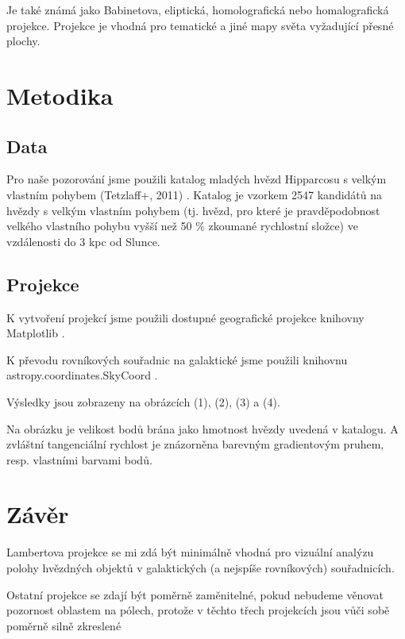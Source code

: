 \documentclass[a4paper,11pt]{article}
\begin{document}
    \hspace{10pt}
    \begin{minipage}[t]{0.5\textwidth} 
                Je také známá jako Babinetova, eliptická, homolografická nebo homalografická projekce. Projekce je vhodná pro tematické a jiné mapy světa vyžadující přesné plochy.
        \section{Metodika}
            \subsection{Data}
                Pro naše pozorování jsme použili katalog mladých hvězd Hipparcosu s velkým vlastním pohybem (Tetzlaff+, 2011) \cite{catalog}. Katalog je vzorkem 2547 kandidátů na hvězdy s velkým vlastním pohybem (tj. hvězd, pro které je pravděpodobnost velkého vlastního pohybu vyšší než 50 \%  zkoumané rychlostní složce) ve vzdálenosti do 3 kpc od Slunce.
            \subsection{Projekce}
                K vytvoření projekcí jsme použili dostupné geografické projekce knihovny Matplotlib \cite{proj}.
                \par K převodu rovníkových souřadnic na galaktické jsme použili knihovnu astropy.coordinates.SkyCoord \cite{astropy}. 
                \par Výsledky jsou zobrazeny na obrázcích (1), (2), (3) a (4).
                \par Na obrázku je velikost bodů brána jako hmotnost hvězdy uvedená v katalogu. A zvláštní tangenciální rychlost je znázorněna barevným gradientovým pruhem, resp. vlastními barvami bodů. 
            \section{Závěr}
                Lambertova projekce se mi zdá být minimálně vhodná pro vizuální analýzu polohy hvězdných objektů v galaktických (a nejspíše rovníkových) souřadnicích.
                \par Ostatní projekce se zdají být poměrně zaměnitelné, pokud nebudeme věnovat pozornost oblastem na pólech, protože v těchto třech projekcích jsou vůči sobě poměrně silně zkreslené
    \end{minipage}
    \newpage
    \renewcommand{\refname}{Odkazy}
\end{document}
